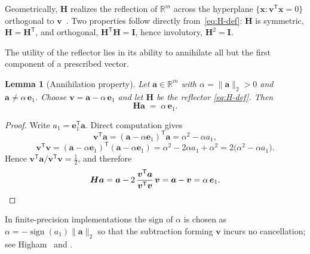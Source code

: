 \documentclass[11pt,a4paper]{article}
\newtheorem{lemma}[theorem]{Lemma}
\theoremstyle{definition}
\newcommand{\R}{\mathbb{R}}
\begin{document}
Geometrically, $\bm H$ realizes the reflection of $\R^{m}$ across the
hyperplane $\{\bm x:\bm v^{\mathsf T}\bm x=0\}$ orthogonal to
$\bm v$~\cite[Lecture~10]{trefethenbau1997}. Two properties follow
directly from~\eqref{eq:H-def}: $\bm H$ is symmetric,
$\bm H=\bm H^{\mathsf T}$, and orthogonal,
$\bm H^{\mathsf T}\bm H=\bm I$, hence involutory,
$\bm H^{2}=\bm I$.

The utility of the reflector lies in its ability to annihilate all but
the first component of a prescribed vector.

\begin{lemma}[Annihilation property]
\label{lem:annihilation}
Let $\bm a\in\R^{m}$ with $\alpha=\|\bm a\|_{2}>0$ and
$\bm a\neq\alpha\,\bm e_{1}$. Choose
$\bm v=\bm a-\alpha\,\bm e_{1}$ and let $\bm H$ be the reflector
\eqref{eq:H-def}. Then
\begin{equation}
  \bm H\bm a \;=\; \alpha\,\bm e_{1}.
  \label{eq:Ha}
\end{equation}
\end{lemma}

\begin{proof}
Write $a_{1}=\bm e_{1}^{\mathsf T}\bm a$. Direct computation gives
\begin{equation}
  \bm v^{\mathsf T}\bm a
   =(\bm a-\alpha\bm e_{1})^{\mathsf T}\bm a
   =\alpha^{2}-\alpha a_{1},
\end{equation}
\begin{equation}
  \bm v^{\mathsf T}\bm v
   =(\bm a-\alpha\bm e_{1})^{\mathsf T}(\bm a-\alpha\bm e_{1})
   =\alpha^{2}-2\alpha a_{1}+\alpha^{2}
   =2\bigl(\alpha^{2}-\alpha a_{1}\bigr).
\end{equation}
Hence $\bm v^{\mathsf T}\bm a/\bm v^{\mathsf T}\bm v=\tfrac12$, and
therefore
\begin{equation}
  \bm H\bm a
   =\bm a-2\,\frac{\bm v^{\mathsf T}\bm a}{\bm v^{\mathsf T}\bm v}\,\bm v
   =\bm a-\bm v
   =\alpha\,\bm e_{1}. \qedhere
\end{equation}
\end{proof}

In finite-precision implementations the sign of $\alpha$ is chosen as
$\alpha=-\operatorname{sign}(a_{1})\|\bm a\|_{2}$ so that the
subtraction forming $\bm v$ incurs no cancellation; see
Higham~\cite[\S19.1]{higham2002} and
\cite[\S5.1.3]{golubvanloan2013}.
\end{document}
